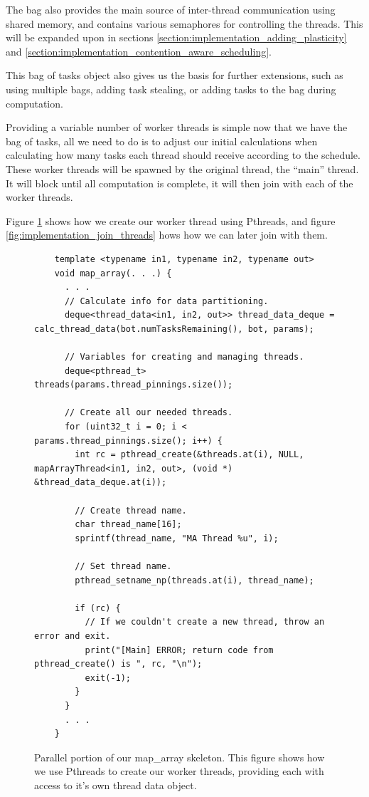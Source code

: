 The bag also provides the main source of inter-thread communication using shared memory, and contains various semaphores for controlling the threads. This will be expanded upon in sections \ref{section:implementation_adding_plasticity} and \ref{section:implementation_contention_aware_scheduling}.

This bag of tasks object also gives us the basis for further extensions, such as using multiple bags, adding task stealing, or adding tasks to the bag during computation.

Providing a variable number of worker threads is simple now that we have the bag of tasks, all we need to do is to adjust our initial calculations when calculating how many tasks each thread should receive according to the schedule. These worker threads will be spawned by the original thread, the ``main'' thread. It will block until all computation is complete, it will then join with each of the worker threads.

Figure \ref{fig:implementation_create_threads} shows how we create our worker thread using Pthreads, and figure \ref{fig:implementation_join_threads} hows how we can later join with them.



\begin{figure}
	\begin{lstlisting}
	template <typename in1, typename in2, typename out>
	void map_array(. . .) {
	  . . .
	  // Calculate info for data partitioning.
	  deque<thread_data<in1, in2, out>> thread_data_deque = calc_thread_data(bot.numTasksRemaining(), bot, params);
  
	  // Variables for creating and managing threads.
	  deque<pthread_t> threads(params.thread_pinnings.size());
  
	  // Create all our needed threads.
	  for (uint32_t i = 0; i < params.thread_pinnings.size(); i++) {
	    int rc = pthread_create(&threads.at(i), NULL, mapArrayThread<in1, in2, out>, (void *) &thread_data_deque.at(i));
  
	    // Create thread name.
	    char thread_name[16];
	    sprintf(thread_name, "MA Thread %u", i);
  
	    // Set thread name.
	    pthread_setname_np(threads.at(i), thread_name);
  
	    if (rc) {
	      // If we couldn't create a new thread, throw an error and exit.
	      print("[Main] ERROR; return code from pthread_create() is ", rc, "\n");
	      exit(-1);
	    }
	  }
	  . . .
	}
	\end{lstlisting}

	\caption{Parallel portion of our map\_array skeleton. This figure shows how we use Pthreads to create our worker threads, providing each with access to it's own thread data object.}
	\label{fig:implementation_create_threads}
\end{figure}



